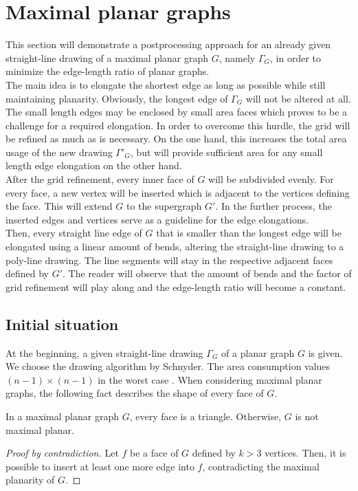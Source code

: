 \section{Maximal planar graphs}
This section will demonstrate a postprocessing approach for an already given straight-line drawing of a maximal planar graph $G$, namely $\Gamma_G$, in order to minimize the edge-length ratio of planar graphs.\\
The main idea is to elongate the shortest edge as long as possible while still maintaining planarity. Obviously, the longest edge of $\Gamma_G$ will not be altered at all. The small length edges may be enclosed by small area faces which proves to be a challenge for a required elongation. In order to overcome this hurdle, the grid will be refined as much as is necessary. On the one hand, this increases the total area usage of the new drawing $\Gamma'_G$, but will provide sufficient area for any small length edge elongation on the other hand.\\
After the grid refinement, every inner face of $G$ will be subdivided evenly. For every face, a new vertex will be inserted which is adjacent to the vertices defining the face. This will extend $G$ to the supergraph $G'$. In the further process, the inserted edges and vertices serve as a guideline for the edge elongations.\\
Then, every straight line edge of $G$ that is smaller than the longest edge will be elongated using a linear amount of bends, altering the straight-line drawing to a poly-line drawing. The line segments will stay in the respective adjacent faces defined by $G'$. The reader will observe that the amount of bends and the factor of grid refinement will play along and the edge-length ratio will become a constant.



\subsection{Initial situation}
At the beginning, a given straight-line drawing $\Gamma_G$ of a planar graph $G$ is given. We choose the drawing algorithm by Schnyder. The area consumption values $(n-1)\times(n-1)$ in the worst case \cite{Schnyder}.
When considering maximal planar graphs, the following fact describes the shape of every face of $G$.
\begin{fact}\label{fact:maximal-triangle}
\end{fact}
In a maximal planar graph $G$, every face is a triangle. Otherwise, $G$ is not maximal planar.
\begin{proof}[Proof by contradiction]
	Let $f$ be a face of $G$ defined by $k > 3$ vertices. Then, it is possible to insert at least one more edge into $f$, contradicting the maximal planarity of $G$.
\end{proof}

